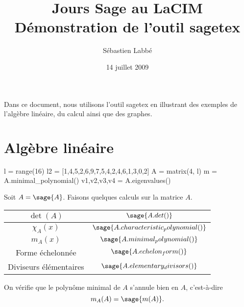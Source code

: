 \documentclass{article}
\begin{document}
\pagestyle{empty}

\title{Jours Sage au LaCIM \\ Démonstration de l'outil sagetex }
\author{Sébastien Labbé} 
\date{14 juillet 2009}

\maketitle
\thispagestyle{empty}

Dans ce document, nous utilisons l'outil sagetex en illustrant des exemples de l'algèbre linéaire, du calcul ainsi que des graphes.

\section{Algèbre linéaire}

\begin{sagesilent}
l = range(16)
l2 = [1,4,5,2,6,9,7,5,4,2,4,6,1,3,0,2]
A = matrix(4, l)
m = A.minimal_polynomial()
v1,v2,v3,v4 = A.eigenvalues()
\end{sagesilent}

Soit $A=\sage{A}$. Faisons quelques calculs sur la matrice $A$. 

\begin{center}
\begin{tabular}{c|c}
$\det(A)$ & $\sage{A.det()}$ \\
\hline
$\chi_A(x)$ & $\sage{A.characteristic_polynomial()}$ \\
\hline
$m_A(x)$ & $\sage{A.minimal_polynomial()}$ \\
\hline
Forme échelonnée & $\sage{A.echelon_form()}$ \\
\hline
Diviseurs élémentaires & $\sage{A.elementary_divisors()}$ \\
\end{tabular}
\end{center}

On vérifie que le polynôme minimal de $A$ s'annule bien en $A$, c'est-à-dire 
\begin{equation*}%
m_A(A) = \sage{m(A)}. 
\end{equation*}

\end{document}
